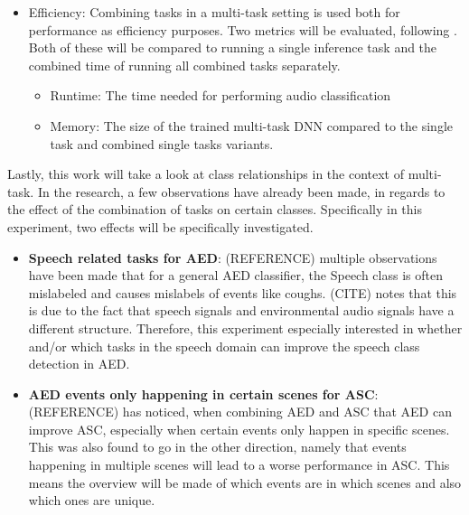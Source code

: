 \begin{itemize}
		\item Efficiency: Combining tasks in a multi-task setting is used both for performance as efficiency purposes. Two metrics will be evaluated, following \cite{georgiev2017heterogeneous}. Both of these will be compared to running a single inference task and the combined time of running all combined tasks separately.
		\begin{itemize}
			\item Runtime: The time needed for performing audio classification 
			\item Memory: The size of the trained multi-task DNN compared to the single task and combined single tasks variants.
		\end{itemize}
	\end{itemize}

	Lastly, this work will take a look at class relationships in the context of multi-task. In the research, a few observations have already been made, in regards to the effect of the combination of tasks on certain classes. Specifically in this experiment, two effects will be specifically investigated. 
	
	\begin{itemize}
		\item \textbf{Speech related tasks for AED}: (REFERENCE) multiple observations have been made that for a general AED classifier, the Speech class is often mislabeled and causes mislabels of events like coughs. (CITE) notes that this is due to the fact that speech signals and environmental audio signals have a different structure. Therefore, this experiment especially interested in whether and/or which tasks in the speech domain can improve the speech class detection in AED. 
		\item \textbf{AED events only happening in certain scenes for ASC}: (REFERENCE) has noticed, when combining AED and ASC that AED can improve ASC, especially when certain events only happen in specific scenes. This was also found to go in the other direction, namely that events happening in multiple scenes will lead to a worse performance in ASC. This means the overview will be made of which events are in which scenes and also which ones are unique. 
	\end{itemize}
